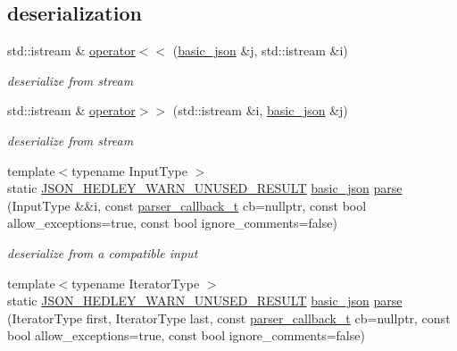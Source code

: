 \subsection*{deserialization}
\begin{DoxyCompactItemize}
\item 
std\+::istream \& \hyperlink{classnlohmann_1_1basic__json_a60ca396028b8d9714c6e10efbf475af6}{operator$<$$<$} (\hyperlink{classnlohmann_1_1basic__json}{basic\+\_\+json} \&j, std\+::istream \&i)
\begin{DoxyCompactList}\small\item\em deserialize from stream \end{DoxyCompactList}\item 
std\+::istream \& \hyperlink{classnlohmann_1_1basic__json_aaf363408931d76472ded14017e59c9e8}{operator$>$$>$} (std\+::istream \&i, \hyperlink{classnlohmann_1_1basic__json}{basic\+\_\+json} \&j)
\begin{DoxyCompactList}\small\item\em deserialize from stream \end{DoxyCompactList}\item 
{\footnotesize template$<$typename Input\+Type $>$ }\\static \hyperlink{json_8hpp_a28d7e3b2d26bd5b8a3806da3db7dea03}{J\+S\+O\+N\+\_\+\+H\+E\+D\+L\+E\+Y\+\_\+\+W\+A\+R\+N\+\_\+\+U\+N\+U\+S\+E\+D\+\_\+\+R\+E\+S\+U\+LT} \hyperlink{classnlohmann_1_1basic__json}{basic\+\_\+json} \hyperlink{classnlohmann_1_1basic__json_a15018ade392a844ea32d5188d1a0b9c6}{parse} (Input\+Type \&\&i, const \hyperlink{classnlohmann_1_1basic__json_a0273d074462644e5d5a7ff313ad0d742}{parser\+\_\+callback\+\_\+t} cb=nullptr, const bool allow\+\_\+exceptions=true, const bool ignore\+\_\+comments=false)
\begin{DoxyCompactList}\small\item\em deserialize from a compatible input \end{DoxyCompactList}\item 
{\footnotesize template$<$typename Iterator\+Type $>$ }\\static \hyperlink{json_8hpp_a28d7e3b2d26bd5b8a3806da3db7dea03}{J\+S\+O\+N\+\_\+\+H\+E\+D\+L\+E\+Y\+\_\+\+W\+A\+R\+N\+\_\+\+U\+N\+U\+S\+E\+D\+\_\+\+R\+E\+S\+U\+LT} \hyperlink{classnlohmann_1_1basic__json}{basic\+\_\+json} \hyperlink{classnlohmann_1_1basic__json_ad832c70af0989389a9a104c21d2d1c5c}{parse} (Iterator\+Type first, Iterator\+Type last, const \hyperlink{classnlohmann_1_1basic__json_a0273d074462644e5d5a7ff313ad0d742}{parser\+\_\+callback\+\_\+t} cb=nullptr, const bool allow\+\_\+exceptions=true, const bool ignore\+\_\+comments=false)

\end{DoxyCompactItemize}
